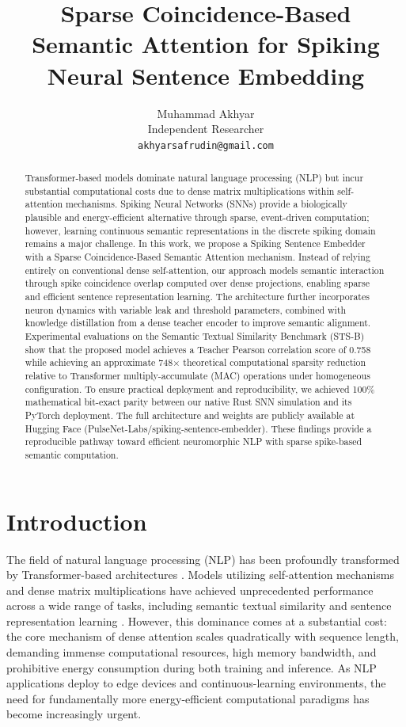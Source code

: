 \documentclass{article} %
\title{Sparse Coincidence-Based Semantic \mbox{Attention} for Spiking Neural Sentence Embedding}
\author{Muhammad Akhyar \\
Independent Researcher \\
\texttt{akhyarsafrudin@gmail.com}
}
\begin{document}
\maketitle

\begin{abstract}
Transformer-based models dominate natural language processing (NLP) but incur substantial computational costs due to dense matrix multiplications within self-attention mechanisms. Spiking Neural Networks (SNNs) provide a biologically plausible and energy-efficient alternative through sparse, event-driven computation; however, learning continuous semantic representations in the discrete spiking domain remains a major challenge. In this work, we propose a Spiking Sentence Embedder with a Sparse Coincidence-Based Semantic Attention mechanism. Instead of relying entirely on conventional dense self-attention, our approach models semantic interaction through spike coincidence overlap computed over dense projections, enabling sparse and efficient sentence representation learning. The architecture further incorporates neuron dynamics with variable leak and threshold parameters, combined with knowledge distillation from a dense teacher encoder to improve semantic alignment. Experimental evaluations on the Semantic Textual Similarity Benchmark (STS-B) show that the proposed model achieves a Teacher Pearson correlation score of 0.758 while achieving an approximate 748$\times$ theoretical computational sparsity reduction relative to Transformer multiply-accumulate (MAC) operations under homogeneous configuration. To ensure practical deployment and reproducibility, we achieved 100\% mathematical bit-exact parity between our native Rust SNN simulation and its PyTorch deployment. The full architecture and weights are publicly available at Hugging Face (PulseNet-Labs/spiking-sentence-embedder). These findings provide a reproducible pathway toward efficient neuromorphic NLP with sparse spike-based semantic computation.
\end{abstract}

\section{Introduction}

The field of natural language processing (NLP) has been profoundly transformed by Transformer-based architectures \citep{vaswani2017attention, devlin2018bert}. Models utilizing self-attention mechanisms and dense matrix multiplications have achieved unprecedented performance across a wide range of tasks, including semantic textual similarity and sentence representation learning \citep{reimers2019sentence, gao2021simcse}. However, this dominance comes at a substantial cost: the core mechanism of dense attention scales quadratically with sequence length, demanding immense computational resources, high memory bandwidth, and prohibitive energy consumption during both training and inference. As NLP applications deploy to edge devices and continuous-learning environments, the need for fundamentally more energy-efficient computational paradigms has become increasingly urgent.
\end{document}
